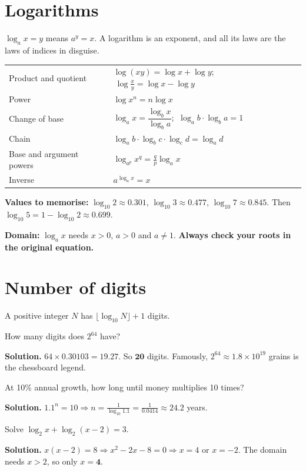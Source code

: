 \documentclass[11pt,a4paper,openany]{report}
\begin{document}
\section{Logarithms}
$\log_ax=y$ means $a^y=x$. A logarithm is an exponent, and all its laws are the laws of indices in disguise.
\begin{center}
\begin{tabular}{ll}
\toprule
Product and quotient & $\log(xy)=\log x+\log y$; $\ \log\frac xy=\log x-\log y$\\
Power & $\log x^n=n\log x$\\
Change of base & $\log_ax=\dfrac{\log_bx}{\log_ba}$; $\ \log_ab\cdot\log_ba=1$\\
Chain & $\log_ab\cdot\log_bc\cdot\log_cd=\log_ad$\\
Base and argument powers & $\log_{a^p}x^q=\frac qp\log_ax$\\
Inverse & $a^{\log_ax}=x$\\
\bottomrule
\end{tabular}
\end{center}
\textbf{Values to memorise:} $\log_{10}2\approx0.301$, $\log_{10}3\approx0.477$, $\log_{10}7\approx0.845$. Then $\log_{10}5=1-\log_{10}2\approx0.699$.

\textbf{Domain:} $\log_ax$ needs $x>0$, $a>0$ and $a\ne1$. \textbf{Always check your roots in the original equation.}

\section{Number of digits}
A positive integer $N$ has $\lfloor\log_{10}N\rfloor+1$ digits.
\begin{example}
How many digits does $2^{64}$ have?

\textbf{Solution.} $64\times0.30103=19.27$. So $\mathbf{20}$ digits. Famously, $2^{64}\approx1.8\times10^{19}$ grains is the chessboard legend.
\end{example}

\begin{example}
At 10\% annual growth, how long until money multiplies 10 times?

\textbf{Solution.} $1.1^n=10\Rightarrow n=\frac{1}{\log_{10}1.1}=\frac1{0.0414}\approx\mathbf{24.2}$ years.
\end{example}

\begin{example}
Solve $\log_2x+\log_2(x-2)=3$.

\textbf{Solution.} $x(x-2)=8\Rightarrow x^2-2x-8=0\Rightarrow x=4$ or $x=-2$. The domain needs $x>2$, so only $x=\mathbf{4}$.
\end{example}
\end{document}
